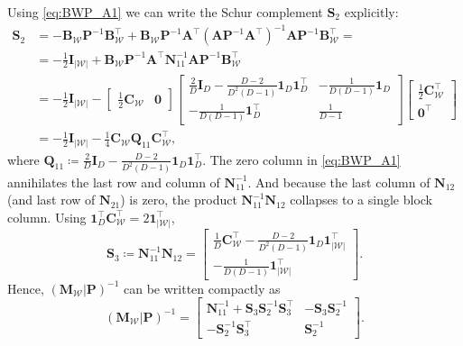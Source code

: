 \documentclass[a4paper,12pt,openany]{book}
\newcommand{\A}{\mathbf{A}}
\newcommand{\B}{\mathbf{B}}
\newcommand{\C}{\mathbf{C}}
\newcommand{\I}{\mathbf{I}}
\newcommand{\M}{\mathbf{M}}
\newcommand{\N}{\mathbf{N}}
\renewcommand{\P}{\mathbf{P}}
\newcommand{\Q}{\mathbf{Q}}
\begin{document}
\begin{appendices}
Using \eqref{eq:BWP_A1} we can write the Schur complement $\mathbf{S}_2$ explicitly:
\begin{equation}
	\begin{split}
	\mathbf{S}_2 &= -\B_\mathcal{W}\P^{-1}\B_\mathcal{W}^\top + \B_\mathcal{W}\P^{-1}\A^\top(\A\P^{-1}\A^\top)^{-1}\A\P^{-1}\B_\mathcal{W}^\top = \\
	&= -\tfrac12\I_{|\mathcal{W}|} + \B_\mathcal{W}\P^{-1}\A^\top\N_{11}^{-1}\A\P^{-1}\B_\mathcal{W}^\top \\
	&= -\tfrac12\I_{|\mathcal{W}|} - \begin{bmatrix} \tfrac12\C_\mathcal{W} & \mathbf{0} \end{bmatrix}
	\begin{bmatrix}
		\displaystyle\frac{2}{D}\I_D-\frac{D-2}{D^2(D-1)}\mathbf{1}_D\mathbf{1}_D^\top &
		\displaystyle-\frac{1}{D(D-1)}\mathbf{1}_D\\[10pt]
		\displaystyle-\frac{1}{D(D-1)}\mathbf{1}_D^\top &
		\displaystyle\frac{1}{D-1}
	\end{bmatrix}
	\begin{bmatrix} \tfrac12\C_\mathcal{W}^\top \\ \mathbf{0}^\top \end{bmatrix} \\
	&= -\tfrac12\I_{|\mathcal{W}|} - \frac{1}{4}\C_\mathcal{W}\Q_{11}\C_\mathcal{W}^\top ,
	\end{split}
\end{equation}
where $\Q_{11}\coloneqq\frac{2}{D}\I_D - \frac{D-2}{D^2(D-1)}\mathbf{1}_D\mathbf{1}_D^\top$. The zero column in \eqref{eq:BWP_A1} annihilates the last row and column of $\N_{11}^{-1}$. And because the last column of $\N_{12}$ (and last row of $\N_{21}$) is zero, the product $\N_{11}^{-1}\N_{12}$ collapses to a single block column. Using $\mathbf{1}_D^\top\C_\mathcal{W}^\top=2\mathbf{1}_{|\mathcal{W}|}^\top$,
\begin{equation}
	\label{eq:U_def}
	\mathbf{S}_3\coloneqq\N_{11}^{-1}\N_{12}
	=
	\begin{bmatrix}
		\displaystyle\frac{1}{D}\C_\mathcal{W}^\top-\frac{D-2}{D^2(D-1)}\mathbf{1}_D\mathbf{1}_{|\mathcal{W}|}^\top\\[8pt]
		\displaystyle-\frac{1}{D(D-1)}\mathbf{1}_{|\mathcal{W}|}^\top
	\end{bmatrix}.
\end{equation}
Hence, $(\M_\mathcal{W}|\P)^{-1}$ can be written compactly as
\begin{equation}
	\label{eq:MWP_inv_compact}
	(\M_\mathcal{W}|\P)^{-1} =
	\begin{bmatrix}
		\N_{11}^{-1}+\mathbf{S}_3\mathbf{S}_2^{-1}\mathbf{S}_3^\top & -\mathbf{S}_3\mathbf{S}_2^{-1}\\[4pt]
		-\mathbf{S}_2^{-1}\mathbf{S}_3^\top & \mathbf{S}_2^{-1}
	\end{bmatrix}.
\end{equation}


\end{appendices}
\end{document}
